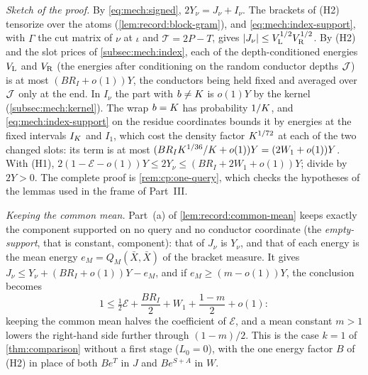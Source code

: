 \emph{Sketch of the proof.} By \eqref{eq:mech:signed}, $2Y_\nu=J_\nu+I_\nu$. The
brackets of (H2) tensorize over the atoms (\cref{lem:record:block-gram}), and
\eqref{eq:mech:index-support}, with $\Gamma$ the cut matrix of $\nu$ at $\iota$ and
$\mathcal T=2P-T$, gives $|J_\nu|\le V_{\rm L}^{1/2}V_{\rm R}^{1/2}$. By (H2) and the
slot prices of \cref{subsec:mech:index}, each of the depth-conditioned energies
$V_{\rm L}$ and $V_{\rm R}$ (the energies after conditioning on
the random conductor depths $\mathcal J$) is at most $(BR_I+o(1))Y$, the conductors being held fixed and averaged over $\mathcal J$
only at the end. In $I_\nu$ the part with $b\ne K$ is $o(1)Y$ by the kernel
(\cref{subsec:mech:kernel}). The wrap $b=K$ has probability $1/K$, and
\eqref{eq:mech:index-support} on the residue coordinates bounds it by energies
at the fixed intervals $I_K$ and $I_1$, which cost the density factor
$K^{1/72}$ at each of the two changed slots: its term is at most
$(BR_IK^{1/36}/K+o(1))Y=(2W_1+o(1))Y$. With (H1),
$2(1-\mathcal E-o(1))Y\le2Y_\nu\le(BR_I+2W_1+o(1))Y$; divide by $2Y>0$. The
complete proof is \cref{rem:cp:one-query}, which checks the hypotheses of the
lemmas used in the frame of Part~III.

\emph{Keeping the common mean.} Part~(a) of \cref{lem:record:common-mean}
keeps exactly the component supported on no query and no conductor
coordinate (the \emph{empty-support}, that is constant, component):
that of $J_\nu$ is $Y_\nu$, and
that of each energy is the mean energy $e_M=Q_M(\bar X,\bar X)$ of the bracket
measure. It gives $J_\nu\le Y_\nu+(BR_I+o(1))Y-e_M$, and if
$e_M\ge(m-o(1))Y$, the conclusion becomes
\[
 1\le\tfrac12\mathcal E+\frac{BR_I}2+W_1+\frac{1-m}2+o(1):
\]
keeping the common mean halves the coefficient of $\mathcal E$, and a
mean constant $m>1$ lowers the right-hand side further through
$(1-m)/2$. This is the case $k=1$ of
\cref{thm:comparison} without a first stage ($L_0=0$), with the one energy
factor $B$ of (H2) in place of both $Be^T$ in $J$ and $Be^{S+A}$ in $W$.

